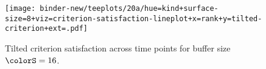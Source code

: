 \begin{figure}
\vspace{0pt}
  \centering
  \texttt{[image: binder-new/teeplots/20a/hue=kind+surface-size=8+viz=criterion-satisfaction-lineplot+x=rank+y=tilted-criterion+ext=.pdf]}

\vspace{-3ex}
\caption{%
  Tilted criterion satisfaction across time points for buffer size $\colorS=16$.
}
\label{fig:hsurf-tilted-implementation-satisfaction}
\end{figure}
